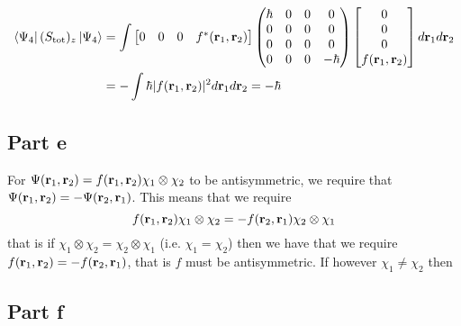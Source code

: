 \documentclass[12pt]{report}
\theoremstyle{custom}
\newcommand{\rb}{\bold{r}}
\begin{document}
  \begin{align*}
    \bra{\Psi_4}(S_{\text{tot}})_z \ket{\Psi_4} &= \int \begin{bmatrix} 0 & 0 & 0 & f^*(\rb_1,\rb_2) \end{bmatrix}  \begin{pmatrix} \hbar & 0 & 0 & 0 \\ 0 & 0 & 0 & 0 \\ 0 & 0 & 0 & 0 \\ 0 & 0 & 0 & -\hbar \end{pmatrix}  \begin{bmatrix} 0 \\ 0 \\ 0 \\ f(\rb_1,\rb_2) \end{bmatrix} d\rb_1 d\rb_2 \\
                                              &=  -\int \hbar |f(\rb_1,\rb_2)|^2 d\rb_1 d\rb_2 = -\hbar
  \end{align*}

\subsection*{Part e}
For $\Psi(\rb_1,\rb_2) = f(\rb_1,\rb_2) \chi_1 \otimes \chi_2$ to be antisymmetric, we require that $\Psi(\rb_1,\rb_2) = - \Psi(\rb_2,\rb_1)$. This means that we require
\begin{equation*}
f(\rb_1,\rb_2) \chi_1 \otimes \chi_2 = -f(\rb_2,\rb_1) \chi_2 \otimes \chi_1
\end{equation*}
that is if $\chi_1 \otimes \chi_2 = \chi_2 \otimes \chi_1$ (i.e. $\chi_1 = \chi_2$) then we have that we require $f(\rb_1, \rb_2) = -f(\rb_2,\rb_1)$, that is $f$ must be antisymmetric. If however $\chi_1 \neq \chi_2$ then 

\subsection*{Part f}
\end{document}
